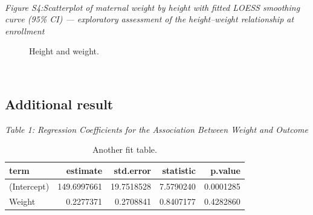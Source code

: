 \documentclass[
  letterpaper,
  DIV=11,
  numbers=noendperiod]{scrartcl}
\begin{document}
~ ~

\emph{Figure S4:Scatterplot of maternal weight by height with fitted
LOESS smoothing curve (95\% CI) --- exploratory assessment of the
height--weight relationship at enrollment}

\begin{figure}


\caption{\label{fig-result2}Height and weight.}

\end{figure}%

~ ~

\subsection{Additional result}\label{additional-result}

\emph{Table 1: Regression Coefficients for the Association Between
Weight and Outcome}

\begin{longtable}[]{@{}lrrrr@{}}

\caption{\label{tbl-resulttable1}Another fit table.}

\tabularnewline

\toprule\noalign{}
term & estimate & std.error & statistic & p.value \\
\midrule\noalign{}
\endhead
\bottomrule\noalign{}
\endlastfoot
(Intercept) & 149.6997661 & 19.7518528 & 7.5790240 & 0.0001285 \\
Weight & 0.2277371 & 0.2708841 & 0.8407177 & 0.4282860 \\

\end{longtable}
\end{document}
